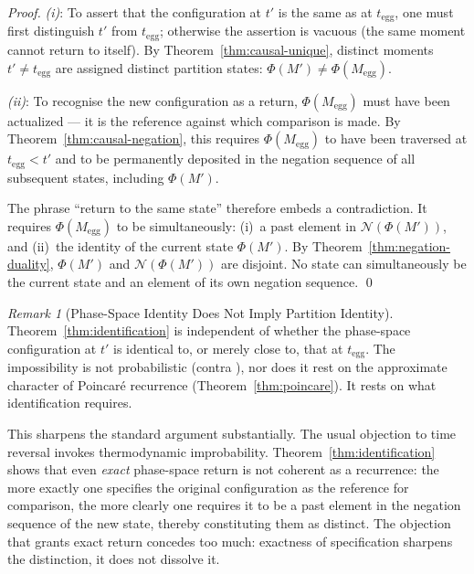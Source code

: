 \documentclass[twocolumn,10pt,a4paper]{article}
\theoremstyle{thmstyle}
\theoremstyle{definition}
\theoremstyle{remark}
\newtheorem{remark}[theorem]{Remark}
\newcommand{\PhiMap}{\varPhi}
\begin{document}
\begin{proof}
\textit{(i)}: To assert that the configuration at $t'$ is the same as at $t_{\mathrm{egg}}$, one must first distinguish $t'$ from $t_{\mathrm{egg}}$; otherwise the assertion is vacuous (the same moment cannot return to itself). By Theorem~\ref{thm:causal-unique}, distinct moments $t' \neq t_{\mathrm{egg}}$ are assigned distinct partition states: $\PhiMap(M') \neq \PhiMap(M_{\mathrm{egg}})$.

\textit{(ii)}: To recognise the new configuration as a return, $\PhiMap(M_{\mathrm{egg}})$ must have been actualized --- it is the reference against which comparison is made. By Theorem~\ref{thm:causal-negation}, this requires $\PhiMap(M_{\mathrm{egg}})$ to have been traversed at $t_{\mathrm{egg}} < t'$ and to be permanently deposited in the negation sequence of all subsequent states, including $\PhiMap(M')$.

The phrase ``return to the same state'' therefore embeds a contradiction. It requires $\PhiMap(M_{\mathrm{egg}})$ to be simultaneously: (i)~a past element in $\mathcal{N}(\PhiMap(M'))$, and (ii)~the identity of the current state $\PhiMap(M')$. By Theorem~\ref{thm:negation-duality}, $\PhiMap(M')$ and $\mathcal{N}(\PhiMap(M'))$ are disjoint. No state can simultaneously be the current state and an element of its own negation sequence. \qed
\end{proof}

\begin{remark}[Phase-Space Identity Does Not Imply Partition Identity]
\label{rem:phase-partition}
Theorem~\ref{thm:identification} is independent of whether the phase-space configuration at $t'$ is identical to, or merely close to, that at $t_{\mathrm{egg}}$. The impossibility is not probabilistic (contra \citealt{boltzmann1877}), nor does it rest on the approximate character of Poincar\'e recurrence (Theorem~\ref{thm:poincare}). It rests on what identification requires.

This sharpens the standard argument substantially. The usual objection to time reversal invokes thermodynamic improbability. Theorem~\ref{thm:identification} shows that even \emph{exact} phase-space return is not coherent as a recurrence: the more exactly one specifies the original configuration as the reference for comparison, the more clearly one requires it to be a past element in the negation sequence of the new state, thereby constituting them as distinct. The objection that grants exact return concedes too much: exactness of specification sharpens the distinction, it does not dissolve it.
\end{remark}
\end{document}
